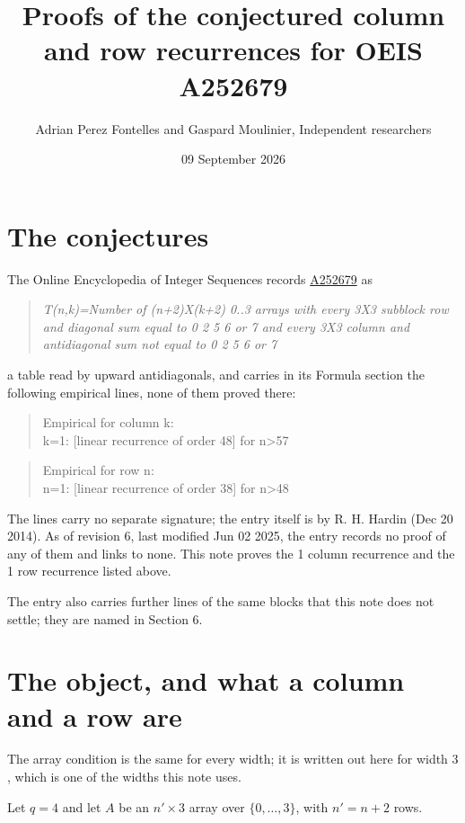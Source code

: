 \documentclass[11pt]{article}
\title{Proofs of the conjectured column and row recurrences for OEIS A252679}
\author{Adrian Perez Fontelles and Gaspard Moulinier, Independent researchers}
\date{09 September 2026}
\theoremstyle{definition}
\begin{document}
\maketitle
\section{The conjectures}

The Online Encyclopedia of Integer Sequences records \href{https://oeis.org/A252679}{A252679} as

\begin{quote}\itshape T(n,k)=Number of (n+2)X(k+2) 0..3 arrays with every 3X3 subblock row and diagonal sum equal to 0 2 5 6 or 7 and every 3X3 column and antidiagonal sum not equal to 0 2 5 6 or 7\end{quote}

a table read by upward antidiagonals, and carries in its Formula section the following empirical lines, none of them proved there:

\begin{quote}\ttfamily Empirical for column k:\\
k=1: [linear recurrence of order 48] for n>57\end{quote}

\begin{quote}\ttfamily Empirical for row n:\\
n=1: [linear recurrence of order 38] for n>48\end{quote}

The lines carry no separate signature; the entry itself is by R. H. Hardin (Dec 20 2014). As of revision 6, last modified Jun 02 2025, the entry records no proof of any of them and links to none. This note proves the 1 column recurrence and the 1 row recurrence listed above.

The entry also carries further lines of the same blocks that this note does not settle; they are named in Section 6.

\section{The object, and what a column and a row are}

The array condition is the same for every width; it is written out here for width $3$, which is one of the widths this note uses.

Let $q = 4$ and let $A$ be an $n' \times 3$ array over $\{0,\dots,3\}$, with $n' = n + 2$ rows.
\end{document}
